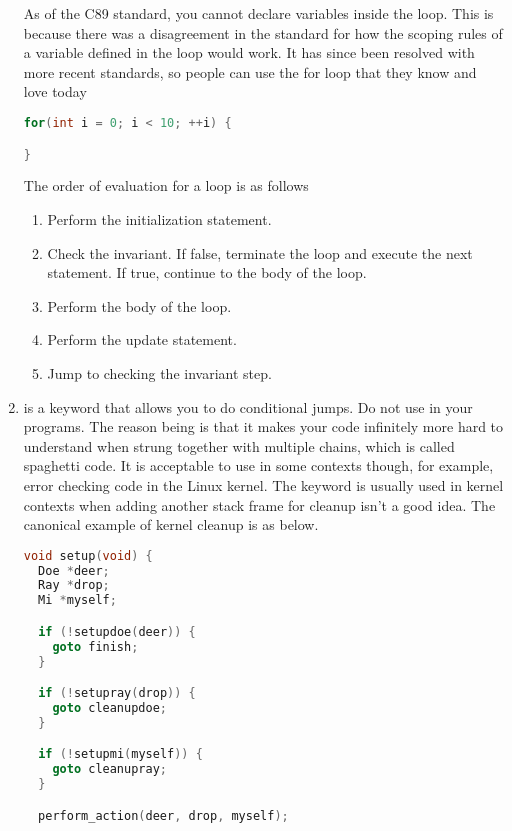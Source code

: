 \begin{enumerate}
	      As of the C89 standard, you cannot declare variables inside the  loop.
        This is because there was a disagreement in the standard for how the scoping rules of a variable defined in the loop would work.
        It has since been resolved with more recent standards, so people can use the for loop that they know and love today

	      \begin{lstlisting}[language=C]
for(int i = 0; i < 10; ++i) {

}
\end{lstlisting}

	      The order of evaluation for a  loop is as follows

	      \begin{enumerate}
		      \item Perform the initialization statement.
		      \item Check the invariant. If false, terminate the loop and execute the next statement. If true, continue to the body of the loop.
		      \item Perform the body of the loop.
		      \item Perform the update statement.
		      \item Jump to checking the invariant step.
	      \end{enumerate}

	    \item {} is a keyword that allows you to do conditional jumps.
        Do not use  in your programs.
        The reason being is that it makes your code infinitely more hard to understand when strung together with multiple chains, which is called spaghetti code.
        It is acceptable to use in some contexts though, for example, error checking code in the Linux kernel.
        The keyword is usually used in kernel contexts when adding another stack frame for cleanup isn't a good idea.
        The canonical example of kernel cleanup is as below.

	      \begin{lstlisting}[language=C]
void setup(void) {
  Doe *deer;
  Ray *drop;
  Mi *myself;

  if (!setupdoe(deer)) {
    goto finish;
  }

  if (!setupray(drop)) {
    goto cleanupdoe;
  }

  if (!setupmi(myself)) {
    goto cleanupray;
  }

  perform_action(deer, drop, myself);


\end{lstlisting}
\end{enumerate}
